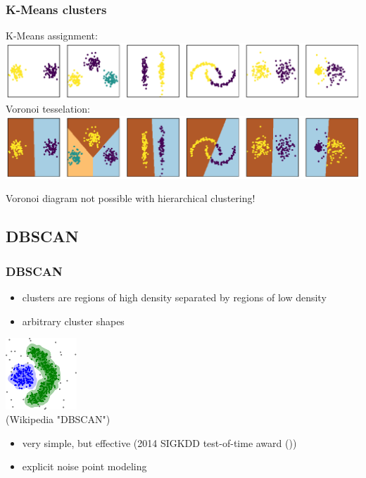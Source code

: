 \documentclass[Nike]{tuberlinbeamer}
\begin{document}
\begin{frame}
  \frametitle{K-Means clusters}
  \begin{center}
    K-Means assignment:
    \centering\includegraphics[width=1.0\textwidth]{kmeans_clusters.pdf}
    \pause
    Voronoi tesselation:
    \centering\includegraphics[width=1.0\textwidth]{kmeans_clusters_voronoi.pdf}
  \end{center}
  Voronoi diagram not possible with hierarchical clustering!
\end{frame}

\subsection{DBSCAN}
\begin{frame}
  \frametitle{DBSCAN}
  \begin{itemize}
    \item clusters are regions of high density separated by regions of low density
    \item arbitrary cluster shapes
  \end{itemize}
  \begin{centering}
  \includegraphics[width=0.2\textwidth]{DBSCAN_data.png}\\
  \tiny (Wikipedia "DBSCAN")
  \end{centering}
  \pause
  \normalsize
  \begin{itemize}
    \item very simple, but effective (2014 SIGKDD test-of-time award (\cite{schubert2017dbscan}))\\
    \item explicit noise point modeling
  \end{itemize}
\end{frame}
\end{document}

